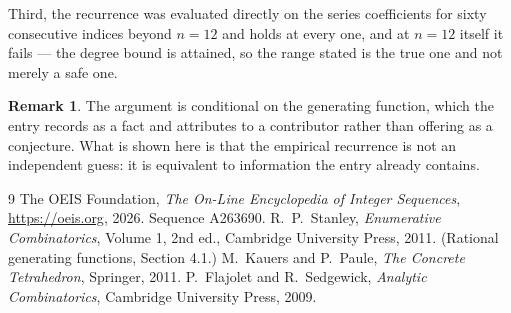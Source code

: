 \documentclass[11pt,a4paper]{article}
\theoremstyle{plain}
\theoremstyle{definition}
\newtheorem{remark}[theorem]{Remark}
\begin{document}
Third, the recurrence was evaluated directly on the series coefficients for sixty consecutive
indices beyond $n=12$ and holds at every one, and at $n=12$ itself it fails --- the
degree bound is attained, so the range stated is the true one and not merely a safe one.

\begin{remark}
The argument is conditional on the generating function, which the entry records as a fact and
attributes to a contributor rather than offering as a conjecture. What is shown here is that
the empirical recurrence is not an independent guess: it is equivalent to information the
entry already contains.
\end{remark}

\begin{thebibliography}{9}
 The OEIS Foundation, \emph{The On-Line Encyclopedia of Integer
Sequences}, \url{https://oeis.org}, 2026. Sequence A263690.
 R.~P.~Stanley, \emph{Enumerative Combinatorics}, Volume 1, 2nd ed.,
Cambridge University Press, 2011. (Rational generating functions, Section 4.1.)
 M.~Kauers and P.~Paule, \emph{The Concrete Tetrahedron}, Springer, 2011.
 P.~Flajolet and R.~Sedgewick, \emph{Analytic Combinatorics}, Cambridge
University Press, 2009.
\end{thebibliography}
\end{document}
